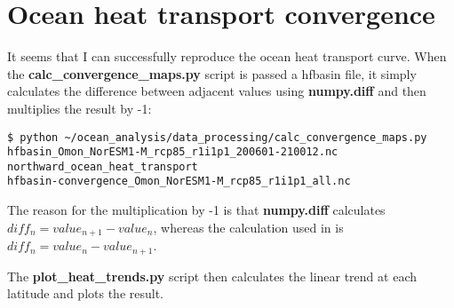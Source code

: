 \section{Ocean heat transport convergence}

It seems that I can successfully reproduce the ocean heat transport curve. When the \textbf{calc_convergence_maps.py} script is passed a hfbasin file, it simply calculates the difference between adjacent values using \textbf{numpy.diff} and then multiplies the result by -1:

\begin{verbatim}
$ python ~/ocean_analysis/data_processing/calc_convergence_maps.py
hfbasin_Omon_NorESM1-M_rcp85_r1i1p1_200601-210012.nc
northward_ocean_heat_transport
hfbasin-convergence_Omon_NorESM1-M_rcp85_r1i1p1_all.nc
\end{verbatim}

The reason for the multiplication by -1 is that \textbf{numpy.diff} calculates $diff_{n} = value_{n+1} - value_{n}$, whereas the calculation used in \citet{Nummelin_2017} is $diff_{n} = value_{n} - value_{n+1}$.    

The \textbf{plot_heat_trends.py} script then calculates the linear trend at each latitude and plots the result. 
